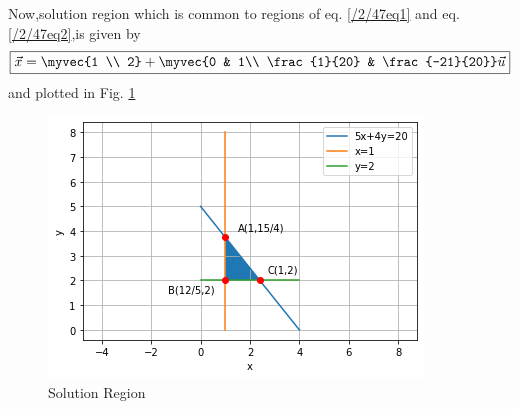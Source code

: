 Now,solution region which is common to regions of eq. \eqref{/2/47eq1} and eq. \eqref{/2/47eq2},is given by
\begin{align}
    \boxed{\vec{x} = \myvec{1 \\ 2}+\myvec{0 & 1\\ \frac{1}{20} & \frac{-21}{20}}\vec{u}}
\end{align}
and plotted in Fig. \ref{/2/47fig:fig1}	
\begin{figure}[!ht]
\centering
\includegraphics[width=\columnwidth]{solutions/su2021/2/47/ASSIGNMENT 11/SOLUTION.png}
\caption{Solution Region}
\label{/2/47fig:fig1}	
\end{figure}

